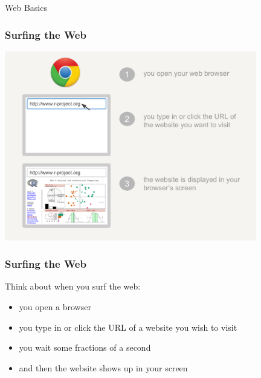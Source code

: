 \documentclass{beamer}\usepackage[]{graphicx}\usepackage[]{color}
\begin{document}

\begin{frame}
 \begin{center}
  \Huge{\textcolor{mandarina}{Web Basics}}
 \end{center}
\end{frame}


\begin{frame}
\frametitle{Surfing the Web}

\begin{center}
\includegraphics[width=11cm]{images/web_surfing.pdf}
\end{center}

\end{frame}


\begin{frame}
\frametitle{Surfing the Web}

\begin{block}{Think about when you surf the web:}
\begin{itemize}
 \item you open a browser \\
 \item you type in or click the URL of a website you wish to visit \\
 \item you wait some fractions of a second
 \item and then the website shows up in your screen
\end{itemize}
\end{block}

\end{frame}
\end{document}
